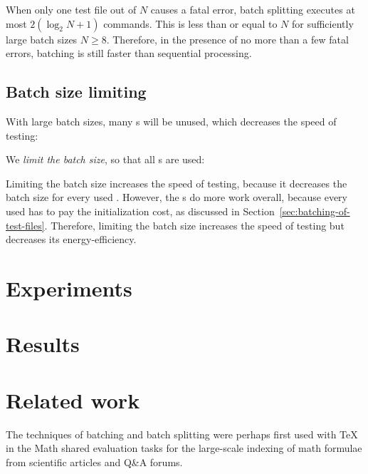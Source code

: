 \documentclass[final]{ltugboat}
\begin{document}
When only one test file out of $N$ causes a fatal error, batch splitting executes at most $2 (\log_2 N + 1)$ commands. This is less than or equal to $N$ for sufficiently large batch sizes $N\geq 8$. Therefore, in the presence of no more than a few fatal errors, batching is still faster than sequential processing.

\subsection{Batch size limiting}

With large batch sizes, many s will be unused, which decreases the speed of testing:

\smallskip
\noindent
\begingroup
\centering

\par
\endgroup

\smallskip
\noindent
We \emph{limit the batch size}, so that all s are used:

\smallskip
\noindent
\begingroup
\centering

\par
\endgroup

\smallskip
Limiting the batch size increases the speed of testing, because it decreases the batch size for every used . However, the s do more work overall, because every used  has to pay the initialization cost, as discussed in Section~\ref{sec:batching-of-test-files}. Therefore, limiting the batch size increases the speed of testing but decreases its energy-efficiency.

\section{Experiments}
\label{sec:experiments}

\section{Results}
\label{sec:results}

\section{Related work}
\label{sec:related-work}

The techniques of batching and batch splitting were perhaps first used with \TeX{} in the Math shared evaluation tasks for the large-scale indexing of math formulae from scientific articles and Q\&A forums.
\end{document}
